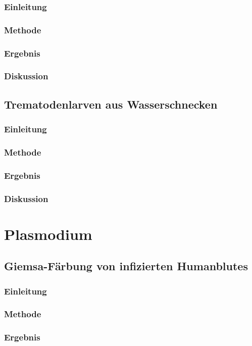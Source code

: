 \documentclass[oneside,10pt,a4paper]{report}
\begin{document}
			\subsection{Einleitung}
			\subsection{Methode}
			\subsection{Ergebnis}
			\subsection{Diskussion}
		
		\section{Trematodenlarven aus Wasserschnecken}
			\subsection{Einleitung}
			\subsection{Methode}
			\subsection{Ergebnis}
			\subsection{Diskussion}
		
	
	\chapter{Plasmodium}
		\section{Giemsa-Färbung von infizierten Humanblutes}
			\subsection{Einleitung}
			\subsection{Methode}
			\subsection{Ergebnis}
\end{document}
